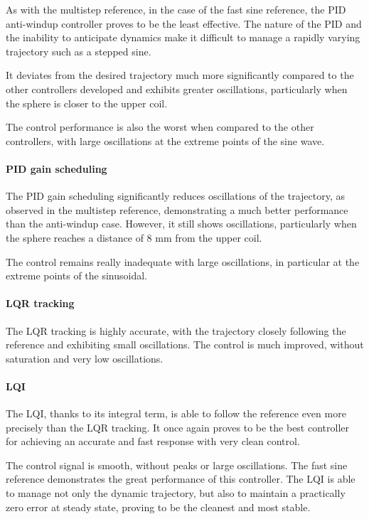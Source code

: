 As with the multistep reference, in the case of the fast sine reference, the PID anti-windup controller proves to be the least effective.
The nature of the PID and the inability to anticipate dynamics make it difficult to manage a rapidly varying trajectory such as a stepped sine.

It deviates from the desired trajectory much more significantly compared to the other controllers developed and exhibits greater oscillations, particularly when the sphere is closer to the upper coil.

The control performance is also the worst when compared to the other controllers, with large oscillations at the extreme points of the sine wave.

\paragraph{PID gain scheduling}

The PID gain scheduling significantly reduces oscillations of the trajectory, as observed in the multistep reference, demonstrating a much better performance than the anti-windup case.
However, it still shows oscillations, particularly when the sphere reaches a distance of 8 mm from the upper coil.

The control remains really inadequate with large oscillations, in particular at the extreme points of the sinusoidal.

\paragraph{LQR tracking}

The LQR tracking is highly accurate, with the trajectory closely following the reference and exhibiting small oscillations.
The control is much improved, without saturation and very low oscillations.


\paragraph{LQI}

The LQI, thanks to its integral term, is able to follow the reference even more precisely than the LQR tracking.
It once again proves to be the best controller for achieving an accurate and fast response with very clean control.

The control signal is smooth, without peaks or large oscillations.
The fast sine reference demonstrates the great performance of this controller.
The LQI is able to manage not only the dynamic trajectory, but also to maintain a practically zero error at steady state, proving to be the cleanest and most stable.


